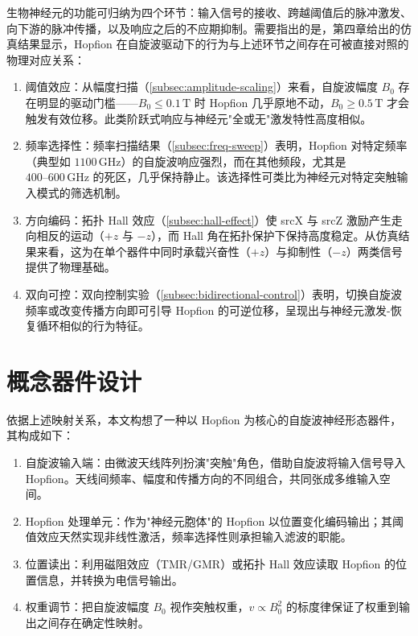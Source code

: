 \documentclass{article}
\begin{document}
生物神经元的功能可归纳为四个环节：输入信号的接收、跨越阈值后的脉冲激发、向下游的脉冲传播，以及响应之后的不应期抑制。需要指出的是，第四章给出的仿真结果显示，Hopfion 在自旋波驱动下的行为与上述环节之间存在可被直接对照的物理对应关系：

\begin{enumerate}
  \item 阈值效应：从幅度扫描（\ref{subsec:amplitude-scaling}）来看，自旋波幅度 $B_0$ 存在明显的驱动门槛——$B_0 \leq 0.1\,\mathrm{T}$ 时 Hopfion 几乎原地不动，$B_0 \geq 0.5\,\mathrm{T}$ 才会触发有效位移。此类阶跃式响应与神经元"全或无"激发特性高度相似。
  \item 频率选择性：频率扫描结果（\ref{subsec:freq-sweep}）表明，Hopfion 对特定频率（典型如 $1100\,\mathrm{GHz}$）的自旋波响应强烈，而在其他频段，尤其是 $400\text{--}600\,\mathrm{GHz}$ 的死区，几乎保持静止。该选择性可类比为神经元对特定突触输入模式的筛选机制。
  \item 方向编码：拓扑 Hall 效应（\ref{subsec:hall-effect}）使 srcX 与 srcZ 激励产生走向相反的运动（$+z$ 与 $-z$），而 Hall 角在拓扑保护下保持高度稳定。从仿真结果来看，这为在单个器件中同时承载兴奋性（$+z$）与抑制性（$-z$）两类信号提供了物理基础。
  \item 双向可控：双向控制实验（\ref{subsec:bidirectional-control}）表明，切换自旋波频率或改变传播方向即可引导 Hopfion 的可逆位移，呈现出与神经元激发-恢复循环相似的行为特征。
\end{enumerate}


\section{概念器件设计}

依据上述映射关系，本文构想了一种以 Hopfion 为核心的自旋波神经形态器件，其构成如下：

\begin{enumerate}
  \item 自旋波输入端：由微波天线阵列扮演"突触"角色，借助自旋波将输入信号导入 Hopfion。天线间频率、幅度和传播方向的不同组合，共同张成多维输入空间。
  \item Hopfion 处理单元：作为"神经元胞体"的 Hopfion 以位置变化编码输出；其阈值效应天然实现非线性激活，频率选择性则承担输入滤波的职能。
  \item 位置读出：利用磁阻效应（TMR/GMR）或拓扑 Hall 效应读取 Hopfion 的位置信息，并转换为电信号输出。
  \item 权重调节：把自旋波幅度 $B_0$ 视作突触权重，$v \propto B_0^2$ 的标度律保证了权重到输出之间存在确定性映射。
\end{enumerate}
\end{document}
